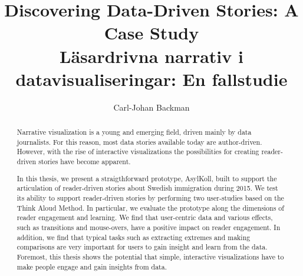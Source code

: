 \documentclass{acmtog} %
\begin{document}


\title{Discovering Data-Driven Stories: A Case Study \\
Läsardrivna narrativ i datavisualiseringar: En fallstudie
}

\author{Carl-Johan Backman
}
\maketitle

\begin{abstract}
Narrative visualization is a young and emerging field, driven mainly by data journalists. For this reason, most data stories available today are author-driven. However, with the rise of interactive visualizations the possibilities for creating reader-driven stories have become apparent. 

In this thesis, we present a straigthforward prototype, AsylKoll, built to support the articulation of reader-driven stories about Swedish immigration during 2015. We test its ability to support reader-driven stories by performing two user-studies based on the Think Aloud Method. In particular, we evaluate the prototype along the dimensions of reader engagement and learning. We find that user-centric data and various effects, such as transitions and mouse-overs, have a positive impact on reader engagement. In addition, we find that typical tasks such as extracting extremes and making comparisons are very important for users to gain insight and learn from the data. Foremost, this thesis shows the potential that simple, interactive visualizations have to make people engage and gain insights from data.
\end{abstract}
\end{document}
